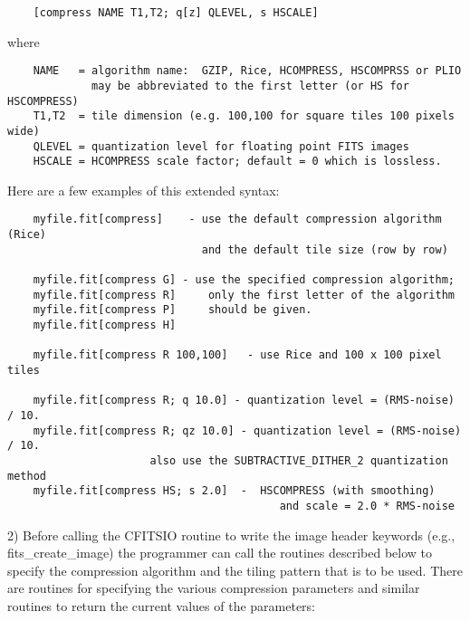 \documentclass[11pt]{book}
\begin{document}
\begin{verbatim}
    [compress NAME T1,T2; q[z] QLEVEL, s HSCALE]
\end{verbatim}
where

\begin{verbatim}
    NAME   = algorithm name:  GZIP, Rice, HCOMPRESS, HSCOMPRSS or PLIO
             may be abbreviated to the first letter (or HS for HSCOMPRESS)
    T1,T2  = tile dimension (e.g. 100,100 for square tiles 100 pixels wide)
    QLEVEL = quantization level for floating point FITS images
    HSCALE = HCOMPRESS scale factor; default = 0 which is lossless.
\end{verbatim}

Here are a few examples of this extended syntax:


\begin{verbatim}
    myfile.fit[compress]    - use the default compression algorithm (Rice)
                              and the default tile size (row by row)

    myfile.fit[compress G] - use the specified compression algorithm;
    myfile.fit[compress R]     only the first letter of the algorithm
    myfile.fit[compress P]     should be given.
    myfile.fit[compress H]

    myfile.fit[compress R 100,100]   - use Rice and 100 x 100 pixel tiles

    myfile.fit[compress R; q 10.0] - quantization level = (RMS-noise) / 10.
    myfile.fit[compress R; qz 10.0] - quantization level = (RMS-noise) / 10.
                      also use the SUBTRACTIVE_DITHER_2 quantization method
    myfile.fit[compress HS; s 2.0]  -  HSCOMPRESS (with smoothing)
                                          and scale = 2.0 * RMS-noise
\end{verbatim}

2)  Before calling the CFITSIO routine to write the image header
keywords (e.g., fits\_create\_image) the programmer can call the
routines described below to specify the compression algorithm and the
tiling pattern that is to be used.  There are routines for specifying
the various compression parameters and similar routines to
return the current values of the parameters:
\label{ffsetcomp}  \label{ffgetcomp}
\end{document}
